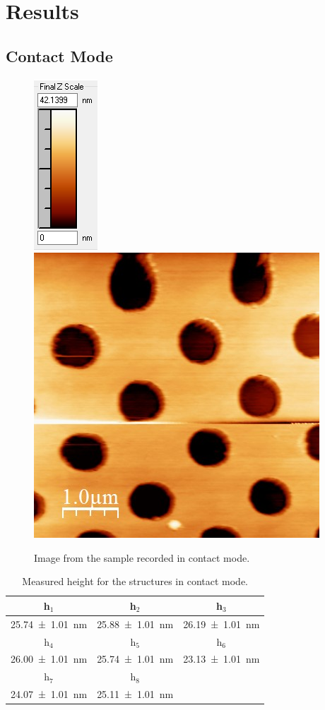 \documentclass[%
 reprint,
amsmath,amssymb,
pra,
]{revtex4-1}
\begin{document}
\section{Results}
\subsection{Contact Mode}

\begin{figure}
\centering
\includegraphics[scale=0.7]{Bilder/Contact_Mode/Rohdaten/try1_scalebar.PNG}
\includegraphics[scale=0.5]{Bilder/Contact_Mode/Rohdaten/try1.JPG}
\caption{Image from the sample recorded in contact mode.}
\label{fig:Contact_raw_data}
\end{figure}

\begin{table}[h]
\centering
\begin{tabular}{|c|c|c|}
\hline 
h$_1$ & h$_2$ & h$_3$ \\ 
\hline 
\SI{25.74 \pm 1.01}{nm} & \SI{25.88 \pm 1.01}{nm} & \SI{26.19 \pm 1.01}{nm} \\ 
\hline
h$_4$ & h$_5$ & h$_6$ \\ 
\hline 
\SI{26.00 \pm 1.01}{nm} & \SI{25.74 \pm 1.01}{nm} & \SI{23.13 \pm 1.01}{nm}  \\ 
\hline 
 h$_7$ & h$_8$ &  \\ 
\hline 
\SI{24.07\pm 1.01}{nm} & \SI{25.11 \pm 1.01}{nm} &  \\ 
\hline 
\end{tabular} 
\caption{Measured height for the structures in contact mode.}
\label{tab:Contact_height}
\end{table}
\end{document}
